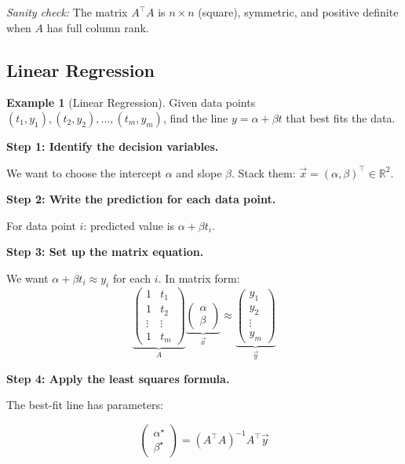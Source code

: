\documentclass[10pt, twocolumn]{article}
\theoremstyle{definition}
\newtheorem{example}{Example}
\theoremstyle{plain}
\newcommand{\RR}{\mathbb{R}}
\begin{document}
\textit{Sanity check:} The matrix $A^\top A$ is $n \times n$ (square), symmetric, and positive definite when $A$ has full column rank. \checkmark

\subsection{Linear Regression}

\begin{example}[Linear Regression]
Given data points $(t_1, y_1), (t_2, y_2), \ldots, (t_m, y_m)$, find the line $y = \alpha + \beta t$ that best fits the data.
\end{example}

\textbf{Step 1: Identify the decision variables.}

We want to choose the intercept $\alpha$ and slope $\beta$. Stack them: $\vec{x} = (\alpha, \beta)^\top \in \RR^2$.

\textbf{Step 2: Write the prediction for each data point.}

For data point $i$: predicted value is $\alpha + \beta t_i$.

\textbf{Step 3: Set up the matrix equation.}

We want $\alpha + \beta t_i \approx y_i$ for each $i$. In matrix form:
\[
    \underbrace{\begin{pmatrix} 1 & t_1 \\ 1 & t_2 \\ \vdots & \vdots \\ 1 & t_m \end{pmatrix}}_{A} \underbrace{\begin{pmatrix} \alpha \\ \beta \end{pmatrix}}_{\vec{x}} \approx \underbrace{\begin{pmatrix} y_1 \\ y_2 \\ \vdots \\ y_m \end{pmatrix}}_{\vec{y}}
\]

\textbf{Step 4: Apply the least squares formula.}

The best-fit line has parameters:
\begin{result}
\[
    \begin{pmatrix} \alpha^\star \\ \beta^\star \end{pmatrix} = (A^\top A)^{-1} A^\top \vec{y}
\]
\end{result}
\end{document}
